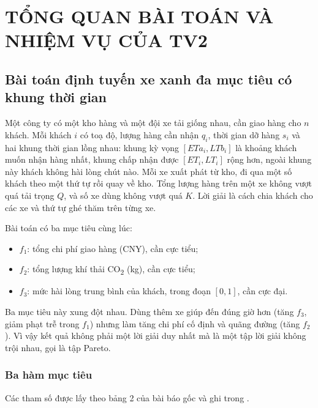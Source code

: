 \chapter{TỔNG QUAN BÀI TOÁN VÀ NHIỆM VỤ CỦA TV2}
\label{chap:tongquan}

\section{Bài toán định tuyến xe xanh đa mục tiêu có khung thời gian}

Một công ty có một kho hàng và một đội xe tải giống nhau, cần giao hàng cho $n$ khách. Mỗi khách $i$
có toạ độ, lượng hàng cần nhận $q_i$, thời gian dỡ hàng $s_i$ và hai khung thời gian lồng nhau: khung kỳ
vọng $[ETa_i, LTb_i]$ là khoảng khách muốn nhận hàng nhất, khung chấp nhận được $[ET_i, LT_i]$ rộng hơn,
ngoài khung này khách không hài lòng chút nào. Mỗi xe xuất phát từ kho, đi qua một số khách theo một thứ
tự rồi quay về kho. Tổng lượng hàng trên một xe không vượt quá tải trọng $Q$, và số xe dùng không vượt
quá $K$. Lời giải là cách chia khách cho các xe và thứ tự ghé thăm trên từng xe.

Bài toán có ba mục tiêu cùng lúc:
\begin{itemize}
  \item $f_1$: tổng chi phí giao hàng (CNY), cần cực tiểu;
  \item $f_2$: tổng lượng khí thải CO\textsubscript{2} (kg), cần cực tiểu;
  \item $f_3$: mức hài lòng trung bình của khách, trong đoạn $[0,1]$, cần cực đại.
\end{itemize}
Ba mục tiêu này xung đột nhau. Dùng thêm xe giúp đến đúng giờ hơn (tăng $f_3$, giảm phạt trễ trong $f_1$)
nhưng làm tăng chi phí cố định và quãng đường (tăng $f_2$). Vì vậy kết quả không phải một lời giải duy
nhất mà là một tập lời giải không trội nhau, gọi là tập Pareto.

\subsection{Ba hàm mục tiêu}

Các tham số được lấy theo bảng 2 của bài báo gốc và ghi trong .

